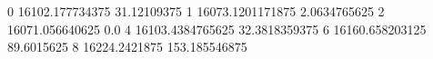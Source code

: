 0 16102.177734375 31.12109375
1 16073.1201171875 2.0634765625
2 16071.056640625 0.0
4 16103.4384765625 32.3818359375
6 16160.658203125 89.6015625
8 16224.2421875 153.185546875
